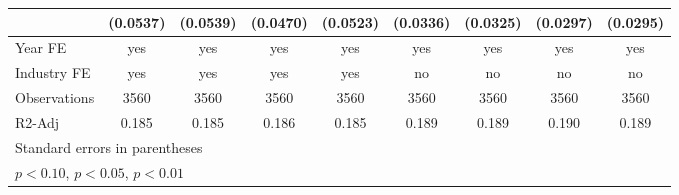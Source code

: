 \begin{table}[htbp]
\begin{tabular}{l*{8}{c}}
                    &    (0.0537)         &    (0.0539)         &    (0.0470)         &    (0.0523)         &    (0.0336)         &    (0.0325)         &    (0.0297)         &    (0.0295)         \\
\hline
Year FE             &         yes         &         yes         &         yes         &         yes         &         yes         &         yes         &         yes         &         yes         \\
Industry FE         &         yes         &         yes         &         yes         &         yes         &          no         &          no         &          no         &          no         \\
Observations        &        3560         &        3560         &        3560         &        3560         &        3560         &        3560         &        3560         &        3560         \\
R2-Adj              &       0.185         &       0.185         &       0.186         &       0.185         &       0.189         &       0.189         &       0.190         &       0.189         \\
\hline\hline
\multicolumn{9}{l}{\footnotesize Standard errors in parentheses}\\
\multicolumn{9}{l}{\footnotesize \sym{*} \(p<0.10\), \sym{**} \(p<0.05\), \sym{***} \(p<0.01\)}\\
\end{tabular}
\end{table}

